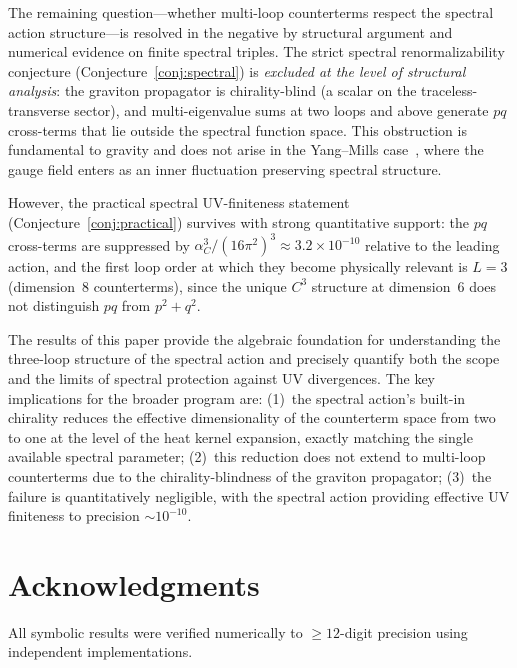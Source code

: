 \documentclass[12pt,a4paper]{article}
\theoremstyle{definition}
\theoremstyle{remark}
\begin{document}
The remaining question---whether multi-loop counterterms respect the spectral
action structure---is resolved in the negative by structural argument
and numerical evidence on finite spectral triples.  The strict spectral
renormalizability conjecture (Conjecture~\ref{conj:spectral}) is
\emph{excluded at the level of structural analysis}: the graviton propagator is chirality-blind (a scalar on the
traceless-transverse sector), and multi-eigenvalue sums at two loops and above
generate $pq$ cross-terms that lie outside the spectral function space.
This obstruction is fundamental to gravity and does not arise in the
Yang--Mills case~\cite{vanNuland:2021}, where the gauge field enters as an
inner fluctuation preserving spectral structure.

However, the practical spectral UV-finiteness statement
(Conjecture~\ref{conj:practical}) survives with strong quantitative support:
the $pq$ cross-terms are suppressed by $\alpha_C^3/(16\pi^2)^3 \approx
3.2 \times 10^{-10}$ relative to the leading action, and the first loop order
at which they become physically relevant is $L = 3$ (dimension~8
counterterms), since the unique $C^3$ structure at dimension~6 does not
distinguish $pq$ from $p^2 + q^2$.

The results of this paper provide the algebraic foundation for understanding
the three-loop structure of the spectral action and precisely quantify both the
scope and the limits of spectral protection against UV divergences.  The key
implications for the broader program are: (1)~the spectral action's built-in
chirality reduces the effective dimensionality of the counterterm space from
two to one at the level of the heat kernel expansion, exactly matching the
single available spectral parameter; (2)~this reduction does not extend to
multi-loop counterterms due to the chirality-blindness of the graviton
propagator; (3)~the failure is quantitatively negligible, with the spectral
action providing effective UV finiteness to precision $\sim 10^{-10}$.


\section*{Acknowledgments}

All symbolic results were verified numerically to $\geq 12$-digit
precision using independent implementations.


\appendix
\end{document}
